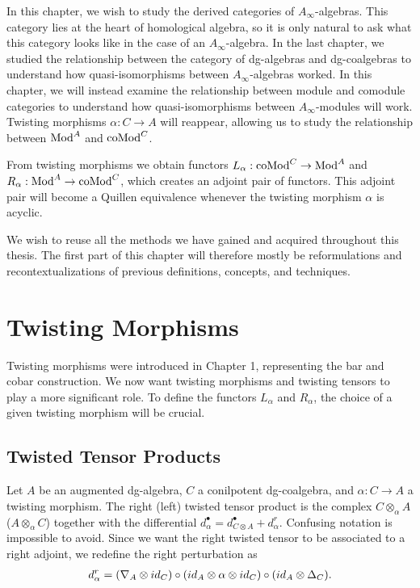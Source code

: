 \documentclass[../thesis.tex]{subfiles}
\begin{document}
    In this chapter, we wish to study the derived categories of $A_\infty$-algebras. This category lies at the heart of homological algebra, so it is only natural to ask what this category looks like in the case of an $A_\infty$-algebra. In the last chapter, we studied the relationship between the category of dg-algebras and dg-coalgebras to understand how quasi-isomorphisms between $A_\infty$-algebras worked. In this chapter, we will instead examine the relationship between module and comodule categories to understand how quasi-isomorphisms between $A_\infty$-modules will work. Twisting morphisms $\alpha: C \rightarrow A$ will reappear, allowing us to study the relationship between $\tt{Mod}^A$ and $\tt{coMod}^C$.

    From twisting morphisms we obtain functors $L_\alpha : \tt{coMod}^C \rightarrow \tt{Mod}^A$ and $R_\alpha : \tt{Mod}^A \rightarrow \tt{coMod}^C$, which creates an adjoint pair of functors. This adjoint pair will become a Quillen equivalence whenever the twisting morphism $\alpha$ is acyclic.

    We wish to reuse all the methods we have gained and acquired throughout this thesis. The first part of this chapter will therefore mostly be reformulations and recontextualizations of previous definitions, concepts, and techniques. 

    \section{Twisting Morphisms}

        Twisting morphisms were introduced in Chapter 1, representing the bar and cobar construction. We now want twisting morphisms and twisting tensors to play a more significant role. To define the functors $L_\alpha$ and $R_\alpha$, the choice of a given twisting morphism will be crucial.  

        \subsection{Twisted Tensor Products}

            Let $A$ be an augmented dg-algebra, $C$ a conilpotent dg-coalgebra, and $\alpha: C \rightarrow A$ a twisting morphism. The right (left) twisted tensor product is the complex $C \otimes_\alpha A$ ($A\otimes_\alpha C$) together with the differential $d_\alpha^\bullet = d_{C\otimes A}^\bullet + d_\alpha^r$. Confusing notation is impossible to avoid. Since we want the right twisted tensor to be associated to a right adjoint, we redefine the right perturbation as
            \begin{align*}
                d_\alpha^r = (\nabla_A\otimes id_C) \circ (id_A \otimes \alpha \otimes id_C) \circ (id_A \otimes \Delta_C)\tt{.}
            \end{align*}
\end{document}
